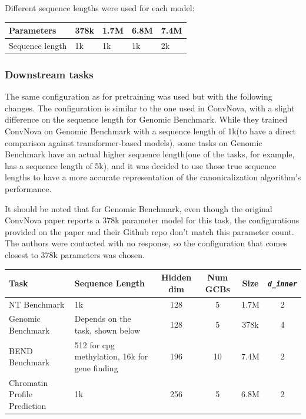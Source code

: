 \documentclass[   ]{article}
\let\oldtexttt\texttt
\renewcommand{\texttt}[1]{\oldtexttt{\itshape #1}}
\begin{document}
Different sequence lengths were used for each model:

{\def\LTcaptype{none} %
\begin{longtable}[]{@{}lllll@{}}
\toprule\noalign{}
Parameters & 378k & 1.7M & 6.8M & 7.4M \\
\midrule\noalign{}
\endhead
\bottomrule\noalign{}
\endlastfoot
Sequence length & 1k & 1k & 1k & 2k \\
\end{longtable}
}

\subsubsection{Downstream tasks}\label{sec:appendix_downstream_tasks}

The same configuration as for pretraining was used but with the
following changes. The configuration is similar to the one used in ConvNova, with a slight difference on the sequence length for Genomic Benchmark. While they trained ConvNova on Genomic Benchmark with a sequence length of 1k(to have a direct comparison against transformer-based models), some tasks on Genomic Benchmark have an actual higher sequence length(one of the tasks, for example, has a sequence length of 5k), and it was decided to use those true sequence lengths to have a more accurate representation of the canonicalization algorithm's performance.

It should be noted that for Genomic Benchmark, even though the original ConvNova paper reports a 378k parameter model for this task, the configurations provided on the paper and their Github repo don't match this parameter count. The authors were contacted with no response, so the configuration that comes closest to 378k parameters was chosen.

\begin{table}[ht]
	\centering
	\begin{tabularx}{\textwidth}{X X c c c c}
		\toprule
		Task & Sequence Length & Hidden dim & Num GCBs & Size & \texttt{d\_inner} \\
		\midrule
		NT Benchmark & 1k & 128 & 5 & 1.7M & 2 \\
		Genomic Benchmark & Depends on the task, shown below & 128 & 5 & 378k & 4 \\
		BEND Benchmark & 512 for cpg methylation, 16k for gene finding & 196 & 10 & 7.4M & 2 \\
		Chromatin Profile Prediction & 1k & 256 & 5 & 6.8M & 2 \\
		\bottomrule
	\end{tabularx}
\end{table}
\end{document}
